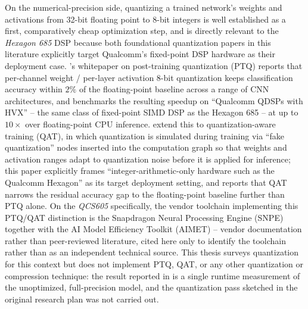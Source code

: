 On the numerical-precision side, quantizing a trained network's weights and activations from 32-bit floating point to 8-bit integers is well established as a first, comparatively cheap optimization step, and is directly relevant to the \textit{Hexagon 685} DSP because both foundational quantization papers in this literature explicitly target Qualcomm's fixed-point DSP hardware as their deployment case. \citeauthor{krishnamoorthiQuantizingDeepConvolutional2018}'s whitepaper on post-training quantization (PTQ) \cite{krishnamoorthiQuantizingDeepConvolutional2018} reports that per-channel weight / per-layer activation 8-bit quantization keeps classification accuracy within $2\%$ of the floating-point baseline across a range of CNN architectures, and benchmarks the resulting speedup on \enquote{Qualcomm QDSPs with HVX} -- the same class of fixed-point SIMD DSP as the Hexagon 685 -- at up to $10\times$ over floating-point CPU inference. \citeauthor{jacobQuantizationTrainingNeural2018} \cite{jacobQuantizationTrainingNeural2018} extend this to quantization-aware training (QAT), in which quantization is simulated during training via \enquote{fake quantization} nodes inserted into the computation graph so that weights and activation ranges adapt to quantization noise before it is applied for inference; this paper explicitly frames \enquote{integer-arithmetic-only hardware such as the Qualcomm Hexagon} as its target deployment setting, and reports that QAT narrows the residual accuracy gap to the floating-point baseline further than PTQ alone. On the \textit{QCS605} specifically, the vendor toolchain implementing this PTQ/QAT distinction is the Snapdragon Neural Processing Engine (SNPE) together with the AI Model Efficiency Toolkit (AIMET) \cite{QualcommAimet2026} -- vendor documentation rather than peer-reviewed literature, cited here only to identify the toolchain rather than as an independent technical source. This thesis surveys quantization for this context but does not implement PTQ, QAT, or any other quantization or compression technique: the result reported in  is a single runtime measurement of the unoptimized, full-precision model, and the quantization pass sketched in the original research plan was not carried out.

